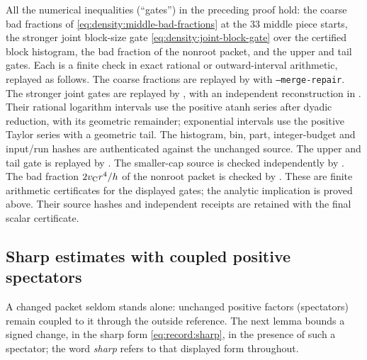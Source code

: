 \begin{certificate}\label{cert:density:packets}
All the numerical inequalities (``gates'') in the preceding proof
hold: the coarse bad fractions of
\eqref{eq:density:middle-bad-fractions} at the $33$ middle piece
starts, the stronger joint block-size gate
\eqref{eq:density:joint-block-gate} over the certified block
histogram, the bad fraction of the nonroot packet, and the upper
and tail gates. Each is a finite check in exact rational or
outward-interval arithmetic, replayed as follows. The coarse
fractions are replayed
by 
with \texttt{--merge-repair}. The stronger joint gates are replayed by
,
with an independent reconstruction in
.
Their rational logarithm intervals use the positive atanh series after
dyadic reduction, with its geometric remainder; exponential intervals
use the positive Taylor series with a geometric tail. The histogram,
bin, part, integer-budget and input/run hashes are authenticated against
the unchanged source. The upper and tail gate is replayed by
.
The smaller-cap source is checked independently by
.
The bad fraction $2v_{\rm C}r^4/h$ of the nonroot packet is
checked by
.
These are finite arithmetic certificates for the displayed gates;
the analytic implication is proved above. Their source hashes and
independent receipts are retained with the final scalar certificate.
\end{certificate}

\subsection{Sharp estimates with coupled positive spectators}

A changed packet seldom stands alone: unchanged positive factors
(spectators) remain coupled to it through the outside reference.
The next lemma bounds a signed change, in the sharp form
\eqref{eq:record:sharp}, in the presence of such a spectator; the
word \emph{sharp} refers to that displayed form throughout.

